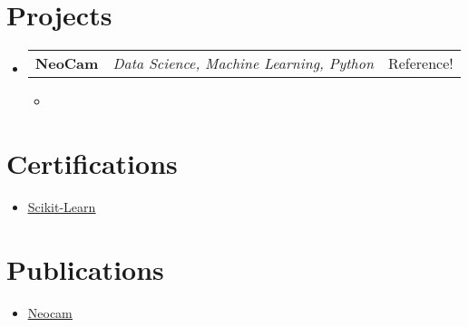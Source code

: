 \documentclass[a4paper,11pt]{article}
\makeatletter
\newcommand{\resumeItem}[1]{
	\item\small{#1}
}
\newcommand{\resumeItemListStart}{\begin{itemize}[rightmargin=0.11in]}
\newcommand{\resumeItemListEnd}{\end{itemize}}
\newcommand{\resumeTrioHeading}[3]{
	\item\small{
		\begin{tabular*}{0.96\textwidth}[t]{
				l@{\extracolsep{\fill}}c@{\extracolsep{\fill}}r
			}
			\textbf{#1} & \textit{#2} & #3
		\end{tabular*}
	}
}
\newcommand{\resumeHeadingListStart}{
	\begin{itemize}[leftmargin=0.15in, label={}]
	}
\newcommand{\resumeHeadingListEnd}{\end{itemize}}
\makeatother
\begin{document}
	\section{Projects}
	\resumeHeadingListStart{}
	
	\resumeTrioHeading{NeoCam}{Data Science, Machine Learning, Python}{Reference!}
	\resumeItemListStart{}
	\resumeItem{}
	\resumeItemListEnd{}
	
	\resumeHeadingListEnd{}
	
	
	
	\section{Certifications}
	\resumeItemListStart{}
	\resumeItem{\href{}{\uline{Scikit-Learn}}}
	\resumeItemListEnd{}
	
	\section{Publications}
	\resumeItemListStart{}
	\resumeItem{\href{}{\uline{Neocam}}}
	\resumeItemListEnd{}
	
\end{document}

